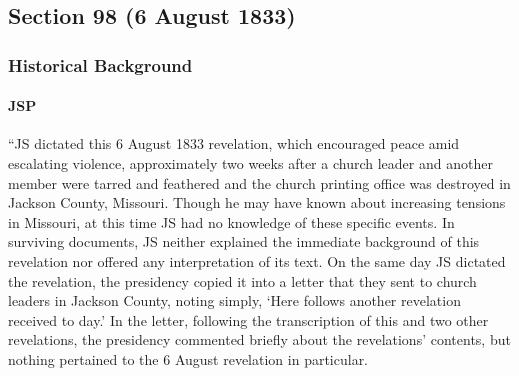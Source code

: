 \subsection{Section 98 (6 August 1833)}
	\label{DC98}
	
	\subsubsection{Historical Background}
		\label{DC98-HB}
		
		\paragraph{JSP}
		
			``JS dictated this 6 August 1833 revelation, which encouraged peace amid escalating violence, approximately two weeks after a church leader and another member were tarred and feathered and the church printing office was destroyed in Jackson County, Missouri. Though he may have known about increasing tensions in Missouri, at this time JS had no knowledge of these specific events. In surviving documents, JS neither explained the immediate background of this revelation nor offered any interpretation of its text. On the same day JS dictated the revelation, the presidency copied it into a letter that they sent to church leaders in Jackson County, noting simply, `Here follows another revelation received to day.' In the letter, following the transcription of this and two other revelations, the presidency commented briefly about the revelations' contents, but nothing pertained to the 6 August revelation in particular.
			
